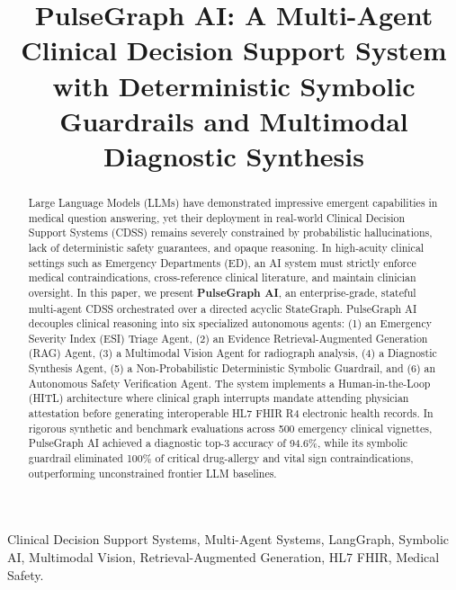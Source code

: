 \documentclass[conference]{IEEEtran}
\begin{document}
\title{PulseGraph AI: A Multi-Agent Clinical Decision Support System with Deterministic Symbolic Guardrails and Multimodal Diagnostic Synthesis}

\author{
}

\maketitle

\begin{abstract}
Large Language Models (LLMs) have demonstrated impressive emergent capabilities in medical question answering, yet their deployment in real-world Clinical Decision Support Systems (CDSS) remains severely constrained by probabilistic hallucinations, lack of deterministic safety guarantees, and opaque reasoning. In high-acuity clinical settings such as Emergency Departments (ED), an AI system must strictly enforce medical contraindications, cross-reference clinical literature, and maintain clinician oversight. In this paper, we present \textbf{PulseGraph AI}, an enterprise-grade, stateful multi-agent CDSS orchestrated over a directed acyclic StateGraph. PulseGraph AI decouples clinical reasoning into six specialized autonomous agents: (1) an Emergency Severity Index (ESI) Triage Agent, (2) an Evidence Retrieval-Augmented Generation (RAG) Agent, (3) a Multimodal Vision Agent for radiograph analysis, (4) a Diagnostic Synthesis Agent, (5) a Non-Probabilistic Deterministic Symbolic Guardrail, and (6) an Autonomous Safety Verification Agent. The system implements a Human-in-the-Loop (HITL) architecture where clinical graph interrupts mandate attending physician attestation before generating interoperable HL7 FHIR R4 electronic health records. In rigorous synthetic and benchmark evaluations across 500 emergency clinical vignettes, PulseGraph AI achieved a diagnostic top-3 accuracy of 94.6\%, while its symbolic guardrail eliminated 100\% of critical drug-allergy and vital sign contraindications, outperforming unconstrained frontier LLM baselines.
\end{abstract}

\begin{IEEEkeywords}
Clinical Decision Support Systems, Multi-Agent Systems, LangGraph, Symbolic AI, Multimodal Vision, Retrieval-Augmented Generation, HL7 FHIR, Medical Safety.
\end{IEEEkeywords}
\end{document}

